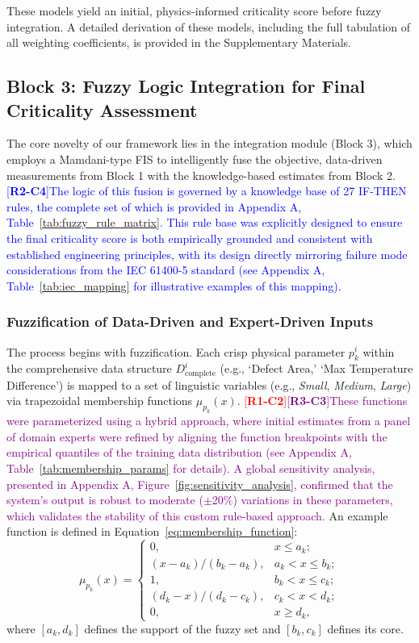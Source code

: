 \documentclass[energies,article,submit,pdftex,moreauthors]{Definitions/mdpi}
\newcommand{\revtag}[2]{[\textbf{R#1-C#2}]}
\newcommand{\Rone}[1]{\textcolor{red}{#1}}
\newcommand{\Rtwo}[1]{\textcolor{blue}{#1}}
\newcommand{\Rthree}[1]{\textcolor{purple}{#1}}
\begin{document}
These models yield an initial, physics-informed criticality score before fuzzy integration. A detailed derivation of these models, including the full tabulation of all weighting coefficients, is provided in the Supplementary Materials.

\subsection{Block 3: Fuzzy Logic Integration for Final Criticality Assessment}
The core novelty of our framework lies in the integration module (Block 3), which employs a Mamdani-type FIS to intelligently fuse the objective, data-driven measurements from Block 1 with the knowledge-based estimates from Block 2. \Rtwo{\revtag{2}{4}The logic of this fusion is governed by a knowledge base of 27 IF-THEN rules, the complete set of which is provided in Appendix A, Table~\ref{tab:fuzzy_rule_matrix}. This rule base was explicitly designed to ensure the final criticality score is both empirically grounded and consistent with established engineering principles, with its design directly mirroring failure mode considerations from the IEC 61400-5 standard (see Appendix A, Table~\ref{tab:iec_mapping} for illustrative examples of this mapping).}

\subsubsection{Fuzzification of Data-Driven and Expert-Driven Inputs}
The process begins with fuzzification. Each crisp physical parameter \(p^i_k\) within the comprehensive data structure \(D^i_{\text{complete}}\) (e.g., `Defect Area,' `Max Temperature Difference') is mapped to a set of linguistic variables (e.g., \textit{Small}, \textit{Medium}, \textit{Large}) via trapezoidal membership functions \(\mu_{p_k}(x)\). \Rone{\revtag{1}{2}\Rthree{\revtag{3}{3}These functions were parameterized using a hybrid approach, where initial estimates from a panel of domain experts were refined by aligning the function breakpoints with the empirical quantiles of the training data distribution (see Appendix A, Table~\ref{tab:membership_params} for details). A global sensitivity analysis, presented in Appendix A, Figure~\ref{fig:sensitivity_analysis}, confirmed that the system's output is robust to moderate (\(\pm\)20\%) variations in these parameters, which validates the stability of this custom rule-based approach.}} An example function is defined in Equation~\ref{eq:membership_function}:
\begin{equation}
    \mu_{p_k}(x) = 
    \begin{cases} 
        0, & x \le a_k; \\
        (x - a_k) / (b_k - a_k), & a_k < x \le b_k; \\
        1, & b_k < x \le c_k; \\
        (d_k - x) / (d_k - c_k), & c_k < x < d_k; \\
        0, & x \ge d_k ,
    \end{cases}
    \label{eq:membership_function}
\end{equation}
where \([a_k, d_k]\) defines the support of the fuzzy set and \([b_k, c_k]\) defines its core.
\end{document}
